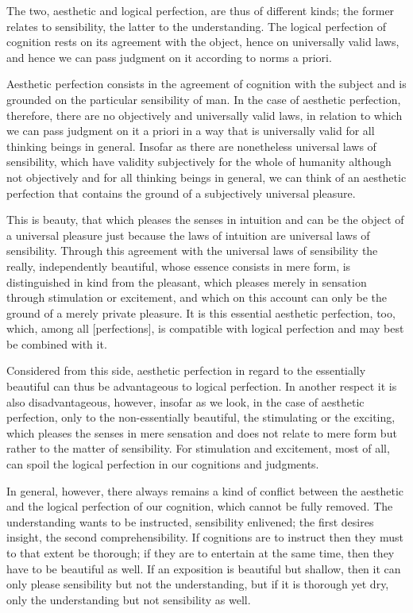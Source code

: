 The two, aesthetic and logical perfection, are thus of different kinds;
the former relates to sensibility, the latter to the understanding.
The logical perfection of cognition rests on its agreement with the object,
hence on universally valid laws, and hence we
can pass judgment on it according to norms a priori.

Aesthetic perfection consists in the agreement of
cognition with the subject
and is grounded on the particular sensibility of man.
In the case of aesthetic perfection, therefore,
there are no objectively and universally valid laws,
in relation to which we can pass judgment on it a priori
in a way that is universally valid
for all thinking beings in general.
Insofar as there are nonetheless universal laws of sensibility,
which have validity subjectively for the whole of humanity
although not objectively and for all thinking beings in general,
we can think of an aesthetic perfection that contains
the ground of a subjectively universal pleasure.

This is beauty, that which pleases the senses in intuition and
can be the object of a universal pleasure just because
the laws of intuition are universal laws of sensibility.
Through this agreement with the universal laws of sensibility
the really, independently beautiful,
whose essence consists in mere form,
is distinguished in kind from the pleasant,
which pleases merely in sensation
through stimulation or excitement,
and which on this account can only be
the ground of a merely private pleasure.
It is this essential aesthetic perfection, too,
which, among all [perfections], is compatible with
logical perfection and may best be combined with it.

    Considered from this side, aesthetic perfection in regard to the essentially
    beautiful can thus be advantageous to logical perfection. In another
    respect it is also disadvantageous, however, insofar as we look, in the case
    of aesthetic perfection, only to the non-essentially beautiful, the stimulating
    or the exciting, which pleases the senses in mere sensation and does not
    relate to mere form but rather to the matter of sensibility. For stimulation
    and excitement, most of all, can spoil the logical perfection in our
    cognitions and judgments.

    In general, however, there always remains a kind of conflict between the
    aesthetic and the logical perfection of our cognition, which cannot be fully
    removed. The understanding wants to be instructed, sensibility enlivened;
    the first desires insight, the second comprehensibility. If cognitions are to
    instruct then they must to that extent be thorough; if they are to entertain
    at the same time, then they have to be beautiful as well. If an exposition is
    beautiful but shallow, then it can only please sensibility but not the understanding,
    but if it is thorough yet dry, only the understanding but not
    sensibility as well.

